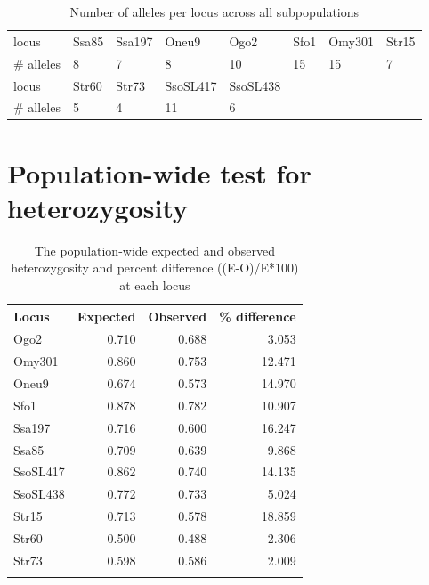 \documentclass[a4paper]{scrartcl}\usepackage[]{graphicx}\usepackage[]{color}
\begin{document}
\begin{table}[ht]
\centering
\begin{tabular}{llllllll}
   \hline
locus & Ssa85 & Ssa197 & Oneu9 & Ogo2 & Sfo1 & Omy301 & Str15 \\ 
   \rowcolor[gray]{0.9} \# alleles & 8 & 7 & 8 & 10 & 15 & 15 & 7 \\ 
  locus & Str60 & Str73 & SsoSL417 & SsoSL438 &  &  &  \\ 
   \rowcolor[gray]{0.9} \# alleles & 5 & 4 & 11 & 6 &  &  &  \\ 
   \hline
\end{tabular}
\caption{Number of alleles per locus across all subpopulations} 
\end{table}







\FloatBarrier
\section{Population-wide test for heterozygosity}

\noindent




\begin{table}[ht]
\centering
\begin{tabular}{lrrr}
  \hline
Locus & Expected & Observed & \% difference \\ 
  \hline
Ogo2 & 0.710 & 0.688 & 3.053 \\ 
   \rowcolor[gray]{0.9} Omy301 & 0.860 & 0.753 & 12.471 \\ 
  Oneu9 & 0.674 & 0.573 & 14.970 \\ 
   \rowcolor[gray]{0.9} Sfo1 & 0.878 & 0.782 & 10.907 \\ 
  Ssa197 & 0.716 & 0.600 & 16.247 \\ 
   \rowcolor[gray]{0.9} Ssa85 & 0.709 & 0.639 & 9.868 \\ 
  SsoSL417 & 0.862 & 0.740 & 14.135 \\ 
   \rowcolor[gray]{0.9} SsoSL438 & 0.772 & 0.733 & 5.024 \\ 
  Str15 & 0.713 & 0.578 & 18.859 \\ 
   \rowcolor[gray]{0.9} Str60 & 0.500 & 0.488 & 2.306 \\ 
  Str73 & 0.598 & 0.586 & 2.009 \\ 
   \rowcolor[gray]{0.9}  \hline
\end{tabular}
\caption{The population-wide expected and observed heterozygosity and percent difference ((E-O)/E*100) at each locus} 
\end{table}
\end{document}
